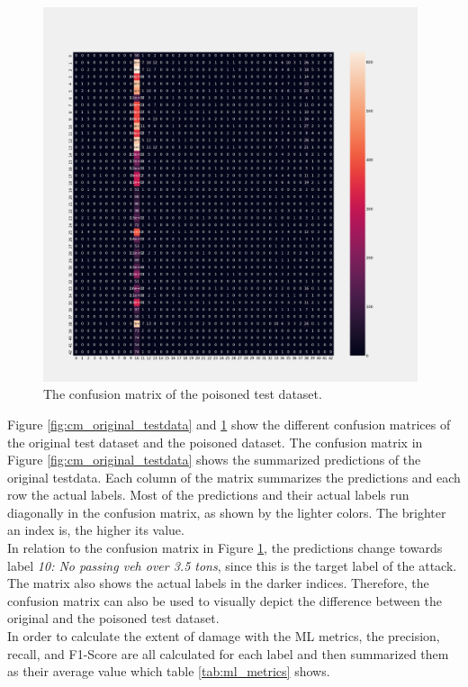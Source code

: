 \begin{figure}[ht!]
  \centering
  \includegraphics[width=11cm]{pictures/cm_poisoned_testdata.png}
  \caption{The confusion matrix of the poisoned test dataset.}
  \label{fig:cm_poisoned_testdata}
\end{figure}

Figure \ref{fig:cm_original_testdata} and \ref{fig:cm_poisoned_testdata} show the different confusion matrices of the original test dataset and the poisoned dataset. The confusion matrix in Figure \ref{fig:cm_original_testdata} shows the summarized predictions of the original testdata. Each column of the matrix summarizes the predictions and each row the actual labels. Most of the predictions and their actual labels run diagonally in the confusion matrix, as shown by the lighter colors. The brighter an index is, the higher its value. \\
In relation to the confusion matrix in Figure \ref{fig:cm_poisoned_testdata}, the predictions change towards label \textit{10: No passing veh over 3.5 tons}, since this is the target label of the attack. The matrix also shows the actual labels in the darker indices. Therefore, the confusion matrix can also be used to visually depict the difference between the original and the poisoned test dataset. \\
In order to calculate the extent of damage with the ML metrics, the precision, recall, and F1-Score are all calculated for each label and then summarized them as their average value which table \ref{tab:ml_metrics} shows.

